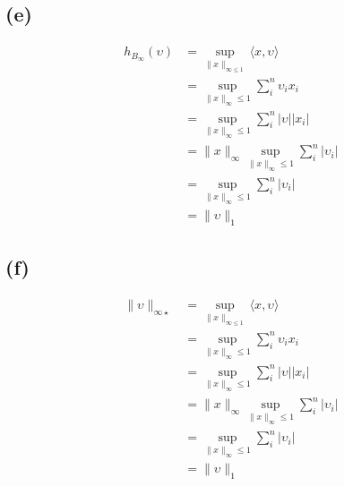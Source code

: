 \documentclass[12pt, a4 paper]{article}
\begin{document}
\begin{framed}
        \subsection{(e)}
        \begin{align}
            h_{B_{\infty}}(\upsilon) &= \sup\limits_{\lVert x \rVert_{\infty \leq 1} }
            \langle x, \upsilon \rangle\\
            &= \sup\limits_{\lVert x \rVert_{\infty} \leq 1} \sum_{i}^{n} \upsilon_{i}x_{i}\\
            &= \sup\limits_{\lVert x \rVert_{\infty} \leq 1} \sum_{i}^{n} \lvert \upsilon
             \rvert \lvert x_{i} \rvert\\
            &= \lVert x \rVert_{\infty} \sup\limits_{\lVert x \rVert_{\infty} \leq 1}
            \sum_{i}^{n} \lvert \upsilon_{i} \rvert\\
            &= \sup\limits_{\lVert x \rVert_{\infty} \leq 1} \sum_{i}^{n} \lvert \upsilon_{i}
             \rvert\\
            &= \lVert \upsilon \rVert_{1}
        \end{align}

        \subsection{(f)}
        \begin{align}
            \lVert \upsilon \rVert_{\infty \star} &= \sup\limits_{\lVert x \rVert_{\infty \leq 1} }
            \langle x, \upsilon \rangle\\
            &= \sup\limits_{\lVert x \rVert_{\infty} \leq 1} \sum_{i}^{n} \upsilon_{i}x_{i}\\
            &= \sup\limits_{\lVert x \rVert_{\infty} \leq 1} \sum_{i}^{n} \lvert \upsilon
             \rvert \lvert x_{i} \rvert\\
            &= \lVert x \rVert_{\infty} \sup\limits_{\lVert x \rVert_{\infty} \leq 1}
            \sum_{i}^{n} \lvert \upsilon_{i} \rvert\\
            &= \sup\limits_{\lVert x \rVert_{\infty} \leq 1} \sum_{i}^{n} \lvert \upsilon_{i}
             \rvert\\
            &= \lVert \upsilon \rVert_{1}
        \end{align}

    \end{framed}
\end{document}
